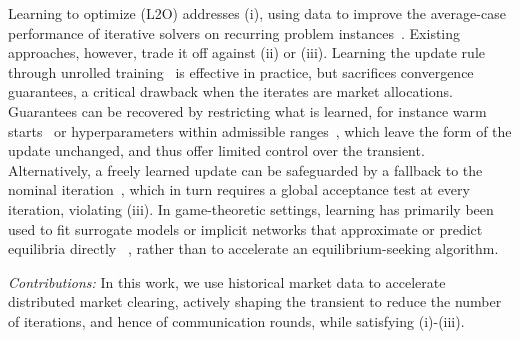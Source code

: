 \documentclass[final]{l4dc2026}
\begin{document}
Learning to optimize (L2O) addresses (i), using data to improve the average-case performance of iterative solvers on recurring problem instances~\citep{chen2022learning}. Existing approaches, however, trade it off against (ii) or (iii).
Learning the update rule through unrolled training~\citep{andrychowicz2016learning}
is effective in practice, but sacrifices convergence guarantees, a critical drawback when the iterates are market allocations. Guarantees can be recovered by restricting what is learned, for instance warm starts~\citep{sambharya2024learning} or hyperparameters within admissible ranges~\citep{ichnowski2021accelerating, doerks2025learning}, which leave the form of the update unchanged, and thus offer limited control over the transient.
 Alternatively, a freely learned update can be safeguarded by a fallback to the nominal iteration~\citep{heaton2023safeguarded}, which in turn requires a global acceptance test at every iteration, violating (iii). In game-theoretic settings, learning has primarily been used to fit surrogate models or implicit networks that approximate or predict equilibria directly
 ~\citep{bichler2021learning, wang2020multi, jungel2025wardropnet, bemporad2026learning, mckenzie2024three}, rather than to accelerate an equilibrium-seeking algorithm.

\emph{Contributions:} In this work, we use historical market data to accelerate distributed market clearing, actively shaping the transient to reduce the number of iterations, and hence of communication rounds, while satisfying (i)-(iii).


\end{document}
